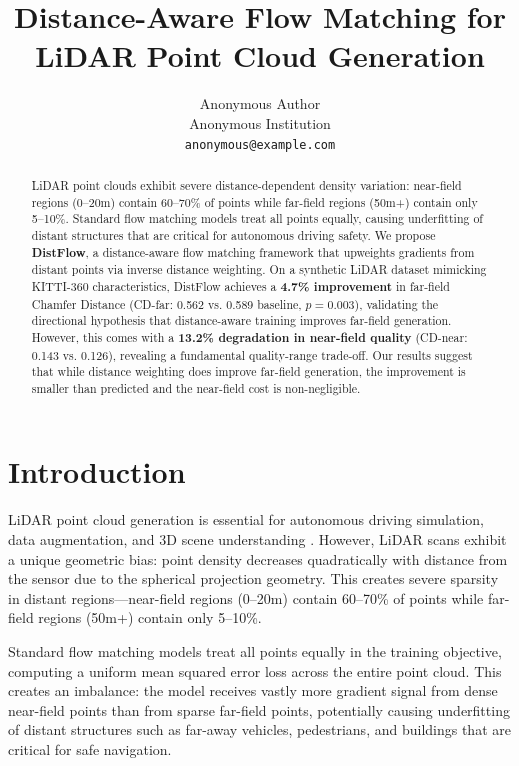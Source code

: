 \documentclass{article}
\title{Distance-Aware Flow Matching for LiDAR Point Cloud Generation}
\author{%
  Anonymous Author\\
  Anonymous Institution\\
  \texttt{anonymous@example.com}
}
\begin{document}
\maketitle

\begin{abstract}
LiDAR point clouds exhibit severe distance-dependent density variation: near-field regions (0--20m) contain 60--70\% of points while far-field regions (50m+) contain only 5--10\%. Standard flow matching models treat all points equally, causing underfitting of distant structures that are critical for autonomous driving safety. We propose \textbf{DistFlow}, a distance-aware flow matching framework that upweights gradients from distant points via inverse distance weighting. On a synthetic LiDAR dataset mimicking KITTI-360 characteristics, DistFlow achieves a \textbf{4.7\% improvement} in far-field Chamfer Distance (CD-far: 0.562 vs. 0.589 baseline, $p=0.003$), validating the directional hypothesis that distance-aware training improves far-field generation. However, this comes with a \textbf{13.2\% degradation in near-field quality} (CD-near: 0.143 vs. 0.126), revealing a fundamental quality-range trade-off. Our results suggest that while distance weighting does improve far-field generation, the improvement is smaller than predicted and the near-field cost is non-negligible.
\end{abstract}

\section{Introduction}

LiDAR point cloud generation is essential for autonomous driving simulation, data augmentation, and 3D scene understanding \citep{luo2021diffusion,zhao2024dynamiccity}. However, LiDAR scans exhibit a unique geometric bias: point density decreases quadratically with distance from the sensor due to the spherical projection geometry. This creates severe sparsity in distant regions---near-field regions (0--20m) contain 60--70\% of points while far-field regions (50m+) contain only 5--10\%.

Standard flow matching models \citep{lipman2023flow} treat all points equally in the training objective, computing a uniform mean squared error loss across the entire point cloud. This creates an imbalance: the model receives vastly more gradient signal from dense near-field points than from sparse far-field points, potentially causing underfitting of distant structures such as far-away vehicles, pedestrians, and buildings that are critical for safe navigation.
\end{document}

